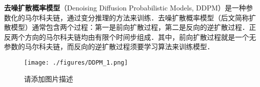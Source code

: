 
\textbf{去噪扩散概率模型}（Denoising Diffusion Probabilistic Models, DDPM）是一种参数化的马尔科夫链，通过变分推理的方法来训练．去噪扩散概率模型（后文简称扩散模型）通常包含两个过程：第一是前向扩散过程，第二是反向的逆扩散过程．正反两个方向的马尔科夫链均由有限个时间步组成．其中，前向扩散过程就是一个无参数的马尔科夫链，而反向的逆扩散过程须要学习算法来训练模型．

\begin{figure}[ht]
\centering
\texttt{[image: ./figures/DDPM\_1.png]}
\caption{请添加图片描述} \label{DDPM_fig1}
\end{figure}